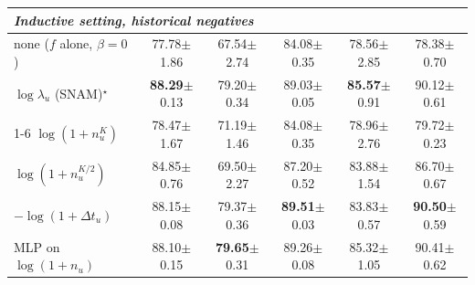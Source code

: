 \begin{table}[t]
\begin{tabular}{lccccc}
\midrule
\multicolumn{6}{l}{\textit{Inductive setting, historical negatives}} \\
\midrule
none ($f$ alone, $\beta=0$) & 77.78{\scriptsize$\pm$1.86} & 67.54{\scriptsize$\pm$2.74} & 84.08{\scriptsize$\pm$0.35} & 78.56{\scriptsize$\pm$2.85} & 78.38{\scriptsize$\pm$0.70} \\
$\log\lambda_u$ (SNAM)$^\star$ & \textbf{88.29}{\scriptsize$\pm$0.13} & 79.20{\scriptsize$\pm$0.34} & 89.03{\scriptsize$\pm$0.05} & \textbf{85.57}{\scriptsize$\pm$0.91} & 90.12{\scriptsize$\pm$0.61} \\
\cmidrule(lr){1-6}
$\log(1+n_u^{K})$ & 78.47{\scriptsize$\pm$1.67} & 71.19{\scriptsize$\pm$1.46} & 84.08{\scriptsize$\pm$0.35} & 78.96{\scriptsize$\pm$2.76} & 79.72{\scriptsize$\pm$0.23} \\
$\log(1+n_u^{K/2})$ & 84.85{\scriptsize$\pm$0.76} & 69.50{\scriptsize$\pm$2.27} & 87.20{\scriptsize$\pm$0.52} & 83.88{\scriptsize$\pm$1.54} & 86.70{\scriptsize$\pm$0.67} \\
$-\log(1+\Delta t_u)$ & 88.15{\scriptsize$\pm$0.08} & 79.37{\scriptsize$\pm$0.36} & \textbf{89.51}{\scriptsize$\pm$0.03} & 83.83{\scriptsize$\pm$0.57} & \textbf{90.50}{\scriptsize$\pm$0.59} \\
MLP on $\log(1+n_u)$ & 88.10{\scriptsize$\pm$0.15} & \textbf{79.65}{\scriptsize$\pm$0.31} & 89.26{\scriptsize$\pm$0.08} & 85.32{\scriptsize$\pm$1.05} & 90.41{\scriptsize$\pm$0.62} \\
\bottomrule
\end{tabular}
\end{table}
